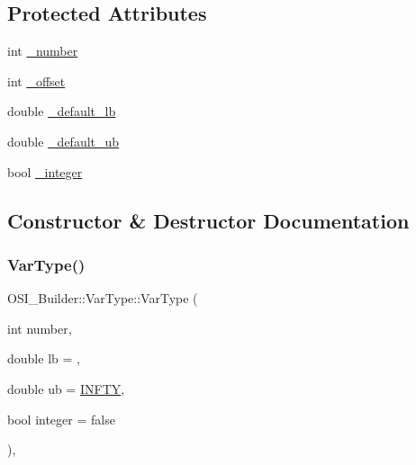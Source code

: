 \subsection*{Protected Attributes}
\begin{DoxyCompactItemize}
\item 
int \hyperlink{class_o_s_i___builder_1_1_var_type_a98f94cb876918c0b57553b6b9dea2a3f}{\+\_\+number}
\item 
int \hyperlink{class_o_s_i___builder_1_1_var_type_a2c51ba12e6b72c3d526aaf315185ad64}{\+\_\+offset}
\item 
double \hyperlink{class_o_s_i___builder_1_1_var_type_ad534d73e98f4ebab5700acf754776cea}{\+\_\+default\+\_\+lb}
\item 
double \hyperlink{class_o_s_i___builder_1_1_var_type_a3c6415eec7842a6dee942b53bd931618}{\+\_\+default\+\_\+ub}
\item 
bool \hyperlink{class_o_s_i___builder_1_1_var_type_abd1bed5e49fa1845f2e5e7e3fed6c8f7}{\+\_\+integer}
\end{DoxyCompactItemize}


\subsection{Constructor \& Destructor Documentation}
\mbox{\label{class_o_s_i___builder_1_1_var_type_ab1bac3305f1a1f4353b6e4cf382c2077}} 
\subsubsection{\texorpdfstring{Var\+Type()}{VarType()}\hspace{0.1cm}{\footnotesize\ttfamily [1/2]}}
{\footnotesize\ttfamily O\+S\+I\+\_\+\+Builder\+::\+Var\+Type\+::\+Var\+Type (\begin{DoxyParamCaption}\item[{int}]{number,  }\item[{double}]{lb = {},  }\item[{double}]{ub = {\ttfamily \hyperlink{class_o_s_i___builder_ada1254828d2dd95d33cc28418270f88d}{I\+N\+F\+TY}},  }\item[{bool}]{integer = {\ttfamily false} }\end{DoxyParamCaption})\hspace{0.3cm}{\ttfamily [inline]}, {\ttfamily [protected]}}

